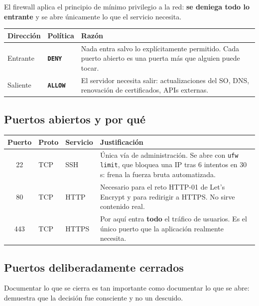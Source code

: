 \documentclass[11pt,letterpaper]{article}
\newcommand{\http}[2]{\textcolor{#1}{\texttt{\textbf{#2}}}}
\begin{document}
El firewall aplica el principio de mínimo privilegio a la red: \textbf{se
deniega todo lo entrante} y se abre únicamente lo que el servicio necesita.

\begin{center}
\begin{tabular}{@{}l l p{8.4cm}@{}}
\toprule
\textbf{Dirección} & \textbf{Política} & \textbf{Razón} \\
\midrule
Entrante  & \http{qcRed}{DENY}    & Nada entra salvo lo explícitamente permitido. Cada puerto abierto es una puerta más que alguien puede tocar. \\[3pt]
Saliente  & \http{qcGreen}{ALLOW} & El servidor necesita salir: actualizaciones del SO, DNS, renovación de certificados, APIs externas. \\
\bottomrule
\end{tabular}
\end{center}

\subsection{Puertos abiertos y por qué}

\begin{center}
\begin{tabular}{@{}c l l p{7.6cm}@{}}
\toprule
\textbf{Puerto} & \textbf{Proto} & \textbf{Servicio} & \textbf{Justificación} \\
\midrule
22  & TCP & SSH   & Única vía de administración. Se abre con \texttt{ufw limit}, que bloquea una IP tras 6 intentos en 30\,s: frena la fuerza bruta automatizada. \\[4pt]
80  & TCP & HTTP  & Necesario para el reto HTTP-01 de Let's Encrypt y para redirigir a HTTPS. No sirve contenido real. \\[4pt]
443 & TCP & HTTPS & Por aquí entra \textbf{todo} el tráfico de usuarios. Es el único puerto que la aplicación realmente necesita. \\
\bottomrule
\end{tabular}
\end{center}

\subsection{Puertos deliberadamente cerrados}

Documentar lo que se cierra es tan importante como documentar lo que se abre:
demuestra que la decisión fue consciente y no un descuido.
\end{document}
